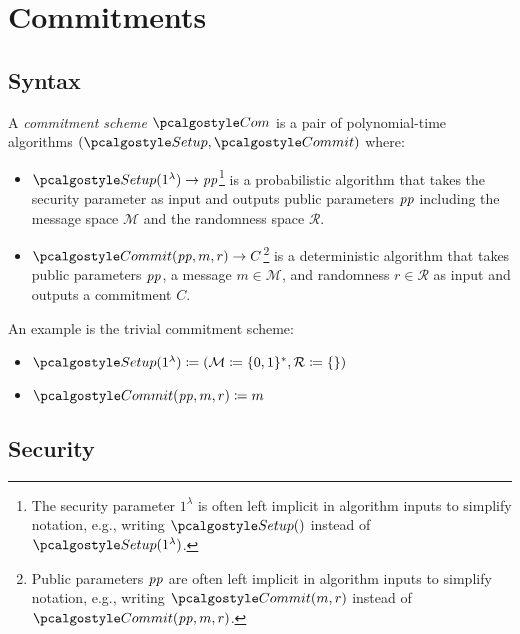 \section{Commitments}\label{sec:commitments}

\subsection{Syntax}
\begin{definition}
  A \emph{commitment scheme} $\algo{Com}$ is a pair of polynomial-time algorithms $(\algo{Setup}, \algo{Commit})$ where:
  \begin{itemize}
    \item $\algo{Setup}(1^\lambda) \rightarrow \params$\footnote{The security parameter $1^\lambda$ is often left implicit in algorithm inputs to simplify notation, e.g., writing $\algo{Setup}()$ instead of $\algo{Setup}(1^\lambda)$.} is a probabilistic algorithm that takes the security parameter as input and outputs public parameters $\mathit{pp}$ including the message space $\mathcal{M}$ and the randomness space $\mathcal{R}$.
    \item $\algo{Commit}(\params, m, r) \rightarrow C$\footnote{Public parameters $\mathit{pp}$ are often left implicit in algorithm inputs to simplify notation, e.g., writing $\algo{Commit}(m, r)$ instead of $\algo{Commit}(\params, m, r)$.} is a deterministic algorithm that takes public parameters $\mathit{pp}$, a message $m \in \mathcal{M}$, and randomness $r \in \mathcal{R}$ as input and outputs a commitment $C$.
  \end{itemize}
\end{definition}

\begin{example}
  An example is the trivial commitment scheme\label{sec:trivial-com}:
  \begin{itemize}
    \item $\algo{Setup}(1^\lambda) \defeq (\mathcal{M} \defeq \{0, 1\}^*, \mathcal{R} \defeq \{\})$
    \item $\algo{Commit}(\params, m, r) \defeq m$
  \end{itemize}
\end{example}

\subsection{Security}

